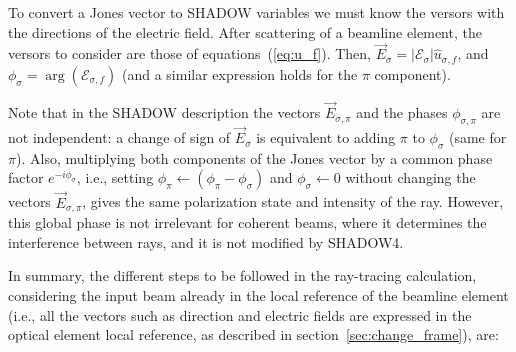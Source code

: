 \documentclass{iucr}
\begin{document}
To convert a Jones vector to SHADOW variables we must know the versors with the directions of the electric field.
After scattering of a beamline element, the versors to consider are those of equations~(\ref{eq:u_f}).
Then, $\vec{E}_\sigma=|\mathcal{E}_\sigma| \hat{u}_{\sigma,f}$, and 
$\phi_\sigma=\arg(\mathcal{E}_{\sigma,f})$
(and a similar expression holds for the $\pi$ component).

Note that in the SHADOW description the vectors $\vec{E}_{\sigma,\pi}$ and the phases $\phi_{\sigma,\pi}$ are not independent: a change of sign of $\vec{E}_\sigma$ is equivalent to adding $\pi$ to $\phi_\sigma$ (same for $\pi$). Also, multiplying both components of the Jones vector by a common phase factor $e^{-i\phi_\sigma}$, i.e., setting $\phi_\pi \xleftarrow{}(\phi_\pi-\phi_\sigma)$ and $\phi_\sigma\xleftarrow{}0$ without changing the vectors $\vec{E}_{\sigma,\pi}$, gives the same polarization state and intensity of the ray. However, this global phase is not irrelevant for coherent beams, where it determines the interference between rays, and it is not modified by SHADOW4.



In summary, the different steps to be followed in the ray-tracing calculation, considering the input beam already in the local reference of the beamline element (i.e., all the vectors such as direction and electric fields are expressed in the optical element local reference, as described in section~\ref{sec:change_frame}), are:
\end{document}
